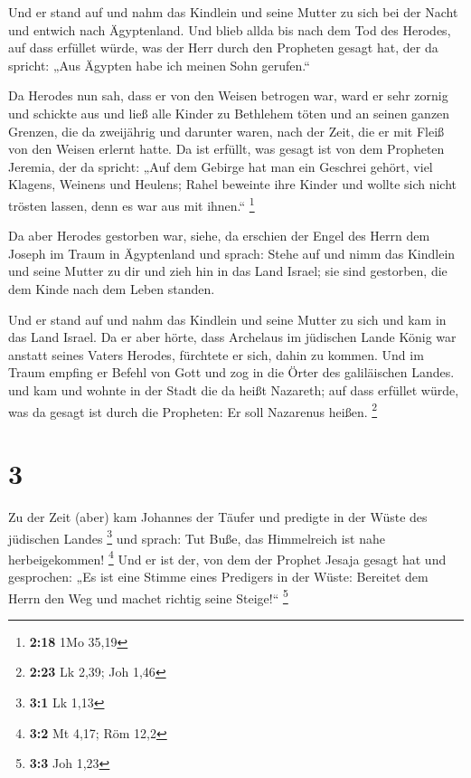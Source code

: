  Und er stand auf und nahm das Kindlein und seine Mutter
zu sich bei der Nacht und entwich nach Ägyptenland.  Und
blieb allda bis nach dem Tod des Herodes, auf dass erfüllet würde, was
der Herr durch den Propheten gesagt hat, der da spricht: „Aus Ägypten
habe ich meinen Sohn gerufen.``

 Da Herodes nun sah, dass er von den Weisen betrogen war,
ward er sehr zornig und schickte aus und ließ alle Kinder zu Bethlehem
töten und an seinen ganzen Grenzen, die da zweijährig und darunter
waren, nach der Zeit, die er mit Fleiß von den Weisen erlernt hatte.
 Da ist erfüllt, was gesagt ist von dem Propheten
Jeremia, der da spricht:  „Auf dem Gebirge hat man ein
Geschrei gehört, viel Klagens, Weinens und Heulens; Rahel beweinte ihre
Kinder und wollte sich nicht trösten lassen, denn es war aus mit
ihnen.`` \footnote{\textbf{2:18} 1Mo 35,19}

 Da aber Herodes gestorben war, siehe, da erschien der
Engel des Herrn dem Joseph im Traum in Ägyptenland  und
sprach: Stehe auf und nimm das Kindlein und seine Mutter zu dir und zieh
hin in das Land Israel; sie sind gestorben, die dem Kinde nach dem Leben
standen.

 Und er stand auf und nahm das Kindlein und seine Mutter
zu sich und kam in das Land Israel.  Da er aber hörte,
dass Archelaus im jüdischen Lande König war anstatt seines Vaters
Herodes, fürchtete er sich, dahin zu kommen. Und im Traum empfing er
Befehl von Gott und zog in die Örter des galiläischen Landes.
 und kam und wohnte in der Stadt die da heißt Nazareth;
auf dass erfüllet würde, was da gesagt ist durch die Propheten: Er soll
Nazarenus heißen. \footnote{\textbf{2:23} Lk 2,39; Joh 1,46}

\hypertarget{section-1}{%
\section{3}\label{section-1}}

 Zu der Zeit (aber) kam Johannes der Täufer und predigte
in der Wüste des jüdischen Landes \footnote{\textbf{3:1} Lk 1,13}
 und sprach: Tut Buße, das Himmelreich ist nahe
herbeigekommen! \footnote{\textbf{3:2} Mt 4,17; Röm 12,2} 
Und er ist der, von dem der Prophet Jesaja gesagt hat und gesprochen:
„Es ist eine Stimme eines Predigers in der Wüste: Bereitet dem Herrn den
Weg und machet richtig seine Steige!{}`` \footnote{\textbf{3:3} Joh 1,23}


